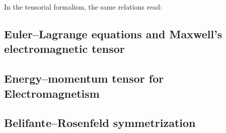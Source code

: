         In the tensorial formalism, the same relations read:


        \subsection{Euler--Lagrange equations and Maxwell's electromagnetic tensor}
        \subsection{Energy--momentum tensor for Electromagnetism}
        \subsection{Belifante--Rosenfeld symmetrization}